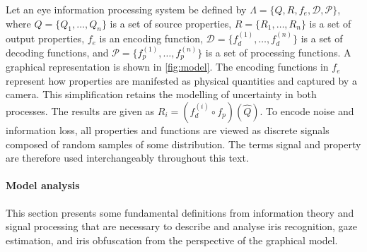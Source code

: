 
Let an eye information processing system be defined by $\Lambda = \{Q, R, f_e, \mathcal{D}, \mathcal{P}\}$, where $Q=\{Q_1, \dots, Q_n\}$ is a set of source properties, $R=\{R_1,\dots,R_n\}$ is a set of output properties, $f_e$ is an encoding function, $\mathcal{D}=\{f_d^{(1)}, \dots, f_d^{(n)}\}$ is a set of decoding functions, and $\mathcal{P}=\{f_p^{(1)}, \dots, f_p^{(n)}\}$ is a set of processing functions. A graphical representation is shown in \autoref{fig:model}. The encoding functions in $f_e$ represent how properties are manifested as physical quantities and captured by a camera. This simplification retains the modelling of uncertainty in both processes. The results are given as $R_i = (f_d^{(i)}\circ f_p)(\hat{Q})$. To encode noise and information loss, all properties and functions are viewed as discrete signals composed of random samples of some distribution. The terms signal and property are therefore used interchangeably throughout this text.




\paragraph{Model analysis}
This section presents some fundamental definitions from information theory and signal processing that are necessary to describe and analyse iris recognition, gaze estimation, and iris obfuscation from the perspective of the graphical model.

